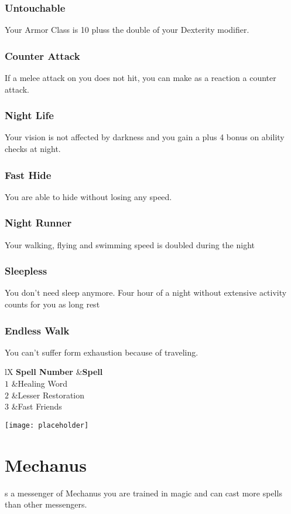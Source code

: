 \documentclass[a4paper,10pt,twoside,twocolumn]{dndbook} %
\begin{document}
	\subsection{Untouchable}
	Your Armor Class is 10 pluss the double of your Dexterity modifier.
	\subsection{Counter Attack}
	If a melee attack on you does not hit, you can make as a reaction a counter attack.
	\subsection{Night Life}
	Your vision is not affected by darkness and you gain a plus 4 bonus on ability checks at night.
	\vfill
	\pagebreak
	\subsection{Fast Hide}
	You are able to hide without losing any speed.
	\subsection{Night Runner}
	Your walking, flying and swimming speed is doubled during the night
	\subsection{Sleepless}
	You don't need sleep anymore. Four hour of a night without extensive activity counts for you as long rest
	\subsection{Endless Walk}
	You can't suffer form exhaustion because of traveling.
	\begin{DndTable}[header=Spells]{lX}
		\textbf{Spell Number}	&\textbf{Spell}\\
		$1$						&Healing Word\\
		$2$						&Lesser Restoration\\
		$3$						&Fast Friends\\
	\end{DndTable}
	\hspace*{2cm}\texttt{[image: placeholder]}
	\chapter{Mechanus}
		s a messenger of Mechanus you are trained in magic and can cast more spells than other messengers. 
\end{document}
